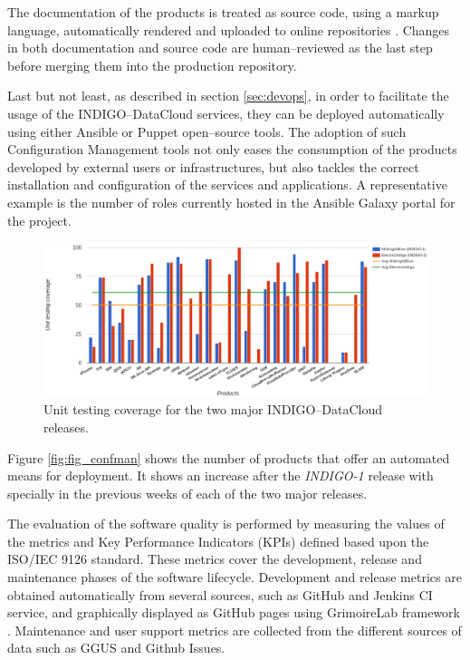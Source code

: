 \documentclass[journal]{IEEEtran}
\begin{document}
The documentation of the products is treated as source code, using a markup
language, automatically rendered and uploaded to online repositories
\cite{indigo-gitbook}. Changes in both documentation and source code are
human--reviewed as the last step before merging them into the production
repository.

Last but not least, as described in section \ref{sec:devops}, in order
to facilitate the usage of the INDIGO--DataCloud services, they can be deployed
automatically using either Ansible \cite{indigo-ansible} or Puppet
\cite{indigo-puppet} open--source tools. The adoption of such Configuration Management
tools not only eases the consumption of the products developed by external users or
infrastructures, but also tackles the correct installation and configuration of the
services and applications. A representative example is the number of roles currently
hosted in the Ansible Galaxy portal for the project.

\begin{figure}[ht]
\centering
\includegraphics[width=\textwidth]{images/unittest.png}
\caption{Unit testing coverage for the two major INDIGO--DataCloud releases.}
\label{fig:fig_unittest}
\end{figure}

Figure \ref{fig:fig_confman} shows the number of products that offer an automated means
for deployment. It shows an increase after the {\sl INDIGO-1} release with specially
in the previous weeks of each of the two major releases.

The evaluation of the software quality is performed by measuring the values of
the metrics and Key Performance Indicators (KPIs) defined based upon the
ISO/IEC 9126 standard. These metrics cover the development, release and
maintenance phases of the software lifecycle. Development and release metrics
are obtained automatically from several sources, such as GitHub and Jenkins CI
service, and graphically displayed as GitHub pages using GrimoireLab framework
\cite{grimoirelab}. Maintenance and user support metrics are collected from the
different sources of data such as GGUS \cite{ggus} and Github Issues.
\end{document}
